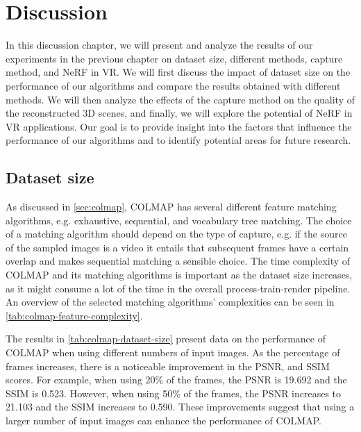 \chapter{Discussion}

In this discussion chapter, we will present and analyze the results of our experiments in the previous chapter on dataset size, different methods, capture method, and NeRF in VR. We will first discuss the impact of dataset size on the performance of our algorithms and compare the results obtained with different methods. We will then analyze the effects of the capture method on the quality of the reconstructed 3D scenes, and finally, we will explore the potential of NeRF in VR applications. Our goal is to provide insight into the factors that influence the performance of our algorithms and to identify potential areas for future research.

\begin{comment}
- Loop back to the introduction, review - claim - agenda
    - In this thesis, we have seen how we can reconstruct 3D scenes and render novel views by optimizing NeRFs on 2D input images.
    - The pipeline for creating NeRFs has become greatly simplified recently. As we've seen we can without problems optimize a NeRF in ~4.5 minutes.


Results:
- Dataset size
- Different methods
- Capture method
- NeRF in VR

- Area size
\end{comment}

\section{Dataset size}
As discussed in \autoref{sec:colmap}, COLMAP has several different feature matching algorithms, e.g. exhaustive, sequential, and vocabulary tree matching. The choice of a matching algorithm should depend on the type of capture, e.g. if the source of the sampled images is a video it entails that subsequent frames have a certain overlap and makes sequential matching a sensible choice. The time complexity of COLMAP and its matching algorithms is important as the dataset size increases, as it might consume a lot of the time in the overall process-train-render pipeline. An overview of the selected matching algorithms' complexities can be seen in \autoref{tab:colmap-feature-complexity}.

The results in \autoref{tab:colmap-dataset-size} present data on the performance of COLMAP when using different numbers of input images. As the percentage of frames increases, there is a noticeable improvement in the PSNR, and SSIM scores. For example, when using 20\% of the frames, the PSNR is 19.692 and the SSIM is 0.523. However, when using 50\% of the frames, the PSNR increases to 21.103 and the SSIM increases to 0.590. These improvements suggest that using a larger number of input images can enhance the performance of COLMAP.

